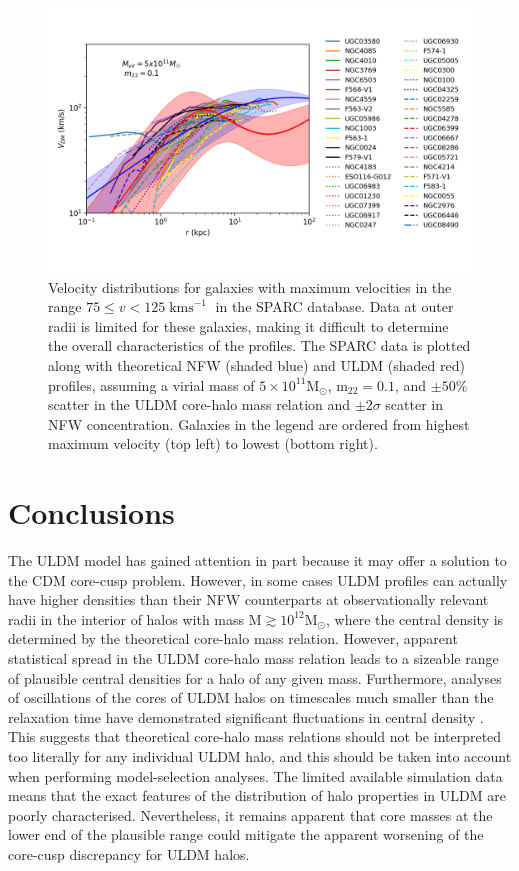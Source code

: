 \documentclass{pasa}%
\begin{document}
\begin{figure}[t]
\centering
\includegraphics[scale=0.9, trim={0.5cm 1cm 0cm 1cm}]{000_vs_SPARC_5_10_11.png}
\caption{Velocity distributions for galaxies with maximum velocities in the range $75 \leq v < 125\operatorname{kms}^{-1}$ in the SPARC database. Data at outer radii is limited for these galaxies, making it difficult to determine the overall characteristics of the profiles. The SPARC data is plotted along with theoretical NFW (shaded blue) and ULDM (shaded red) profiles, assuming a virial mass of $5\times10^{11} \mathrm{M}_{\odot}$, $\mathrm{m_{22}} = 0.1$, and $\pm 50 \%$ scatter in the ULDM core-halo mass relation and $\pm2\sigma$ scatter in NFW concentration. Galaxies in the legend are ordered from highest maximum velocity (top left) to lowest (bottom right).}\label{fig:low_v}
\end{figure}



\section{Conclusions}\label{sec:conclusion}

The ULDM model has gained attention in part because it may offer a solution to the CDM core-cusp problem. However, in some cases ULDM profiles can actually have higher densities than their NFW counterparts at observationally relevant radii in the interior of halos with mass $\mathrm{M} \gtrsim 10^{12} \mathrm{M}_{\odot}$, where the central density is determined by the theoretical core-halo mass relation. However, apparent statistical spread in the ULDM core-halo mass relation \cite{Schive:2014hza} leads to a sizeable range of plausible central densities for a halo of any given mass. Furthermore, analyses of oscillations of the cores of ULDM halos on timescales much smaller than the relaxation time have demonstrated significant fluctuations in central density \cite{Veltmaat:2018dfz}. This suggests that theoretical core-halo mass relations should not be interpreted too literally for any individual ULDM halo, and this should be taken into account when performing model-selection analyses. The limited available simulation data means that the exact features of the distribution of halo properties in ULDM are poorly characterised. Nevertheless, it remains apparent that core masses at the lower end of the plausible range could mitigate the apparent worsening of the core-cusp discrepancy for ULDM halos.  
\end{document}
